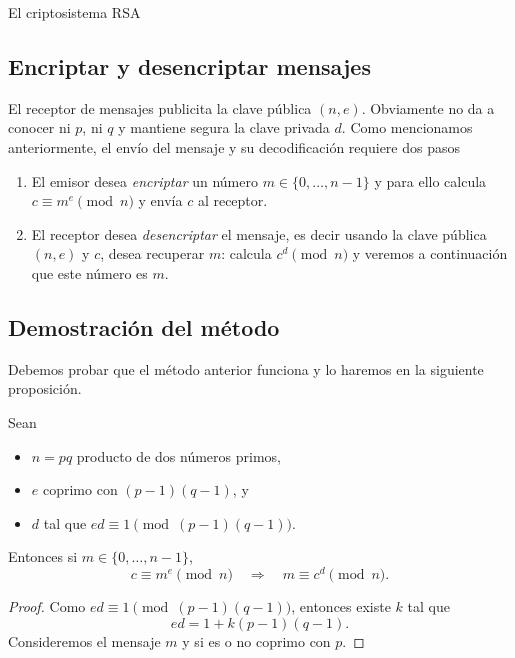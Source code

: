 \begin{section}{El criptosistema RSA}
\begin{observacion*}
\end{observacion*}



\subsection*{Encriptar y desencriptar mensajes}

El receptor de mensajes publicita la clave pública $(n,e)$. Obviamente no da a conocer ni $p$, ni $q$ y mantiene segura la clave privada $d$. Como mencionamos anteriormente, el envío del mensaje y su decodificación requiere dos pasos
\begin{enumerate}[label=\textit{\alph*)}]
\item  El  emisor desea \emph{encriptar }un número $m \in \{0,\ldots,n-1\}$ y para ello calcula $c \equiv m^e \pmod{n}$ y  envía $c$ al receptor.
\item  El receptor desea \emph{desencriptar} el mensaje, es decir usando la clave pública $(n, e)$ y $c$, desea recuperar $m$: calcula $c^d \pmod{n}$ y veremos a continuación que este número es $m$. 
\end{enumerate}

\subsection*{Demostración del método}

Debemos probar que el método anterior funciona  y lo haremos en la siguiente proposición.

\begin{proposicion} \label{rsa}
    Sean 
    \begin{itemize}
        \item $n =pq$ producto de dos números primos,
        \item $e$ coprimo con $(p-1)(q-1)$, y
        \item $d$ tal que  $ed \equiv 1 \pmod{(p-1)(q-1)}$.
    \end{itemize}
    Entonces si $m \in \{0,\ldots,n-1\}$,  
    $$c \equiv m^e \pmod{n}\quad \Rightarrow \quad m \equiv c^d \pmod{n}.$$
\end{proposicion} 
\begin{proof}
Como $ed \equiv 1 \pmod{(p - 1)(q - 1)}$, entonces existe $k$ tal que  
\begin{equation}\label{rsa1}
ed = 1 + k(p - 1)(q - 1).
\end{equation}
Consideremos el mensaje $m$ y si es o no coprimo con $p$.


\end{proof}
\end{section}
